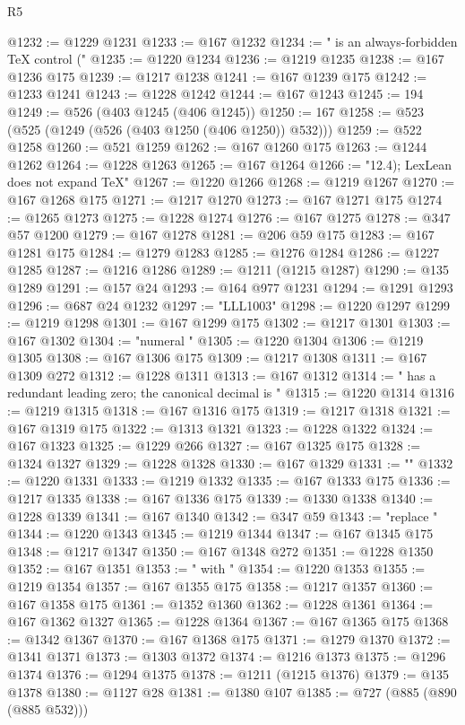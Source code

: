 \begin{lexlean}{R5}
\begin{coremodule}
{{{{{{{{{{{{{{{{{{{{{{{{{{{{{{{{{{{{{{{{{{{{{{{{{{{{{{{{{{{{{{@1232 := @1229 @1231
@1233 := @167 @1232
@1234 := " is an always-forbidden TeX control ("
@1235 := @1220 @1234
@1236 := @1219 @1235
@1238 := @167 @1236 @175
@1239 := @1217 @1238
@1241 := @167 @1239 @175
@1242 := @1233 @1241
@1243 := @1228 @1242
@1244 := @167 @1243
@1245 := 194
@1249 := @526 (@403 @1245 (@406 @1245))
@1250 := 167
@1258 := @523 (@525 (@1249 (@526 (@403 @1250 (@406 @1250)) @532)))
@1259 := @522 @1258
@1260 := @521 @1259
@1262 := @167 @1260 @175
@1263 := @1244 @1262
@1264 := @1228 @1263
@1265 := @167 @1264
@1266 := "12.4); LexLean does not expand TeX"
@1267 := @1220 @1266
@1268 := @1219 @1267
@1270 := @167 @1268 @175
@1271 := @1217 @1270
@1273 := @167 @1271 @175
@1274 := @1265 @1273
@1275 := @1228 @1274
@1276 := @167 @1275
@1278 := @347 @57 @1200
@1279 := @167 @1278
@1281 := @206 @59 @175
@1283 := @167 @1281 @175
@1284 := @1279 @1283
@1285 := @1276 @1284
@1286 := @1227 @1285
@1287 := @1216 @1286
@1289 := @1211 (@1215 @1287)
@1290 := @135 @1289
@1291 := @157 @24
@1293 := @164 @977 @1231
@1294 := @1291 @1293
@1296 := @687 @24 @1232
@1297 := "LLL1003"
@1298 := @1220 @1297
@1299 := @1219 @1298
@1301 := @167 @1299 @175
@1302 := @1217 @1301
@1303 := @167 @1302
@1304 := "numeral "
@1305 := @1220 @1304
@1306 := @1219 @1305
@1308 := @167 @1306 @175
@1309 := @1217 @1308
@1311 := @167 @1309 @272
@1312 := @1228 @1311
@1313 := @167 @1312
@1314 := " has a redundant leading zero; the canonical decimal is "
@1315 := @1220 @1314
@1316 := @1219 @1315
@1318 := @167 @1316 @175
@1319 := @1217 @1318
@1321 := @167 @1319 @175
@1322 := @1313 @1321
@1323 := @1228 @1322
@1324 := @167 @1323
@1325 := @1229 @266
@1327 := @167 @1325 @175
@1328 := @1324 @1327
@1329 := @1228 @1328
@1330 := @167 @1329
@1331 := ""
@1332 := @1220 @1331
@1333 := @1219 @1332
@1335 := @167 @1333 @175
@1336 := @1217 @1335
@1338 := @167 @1336 @175
@1339 := @1330 @1338
@1340 := @1228 @1339
@1341 := @167 @1340
@1342 := @347 @59
@1343 := "replace "
@1344 := @1220 @1343
@1345 := @1219 @1344
@1347 := @167 @1345 @175
@1348 := @1217 @1347
@1350 := @167 @1348 @272
@1351 := @1228 @1350
@1352 := @167 @1351
@1353 := " with "
@1354 := @1220 @1353
@1355 := @1219 @1354
@1357 := @167 @1355 @175
@1358 := @1217 @1357
@1360 := @167 @1358 @175
@1361 := @1352 @1360
@1362 := @1228 @1361
@1364 := @167 @1362 @1327
@1365 := @1228 @1364
@1367 := @167 @1365 @175
@1368 := @1342 @1367
@1370 := @167 @1368 @175
@1371 := @1279 @1370
@1372 := @1341 @1371
@1373 := @1303 @1372
@1374 := @1216 @1373
@1375 := @1296 @1374
@1376 := @1294 @1375
@1378 := @1211 (@1215 @1376)
@1379 := @135 @1378
@1380 := @1127 @28
@1381 := @1380 @107
@1385 := @727 (@885 (@890 (@885 @532)))
}}}}}}}}}}}}}}}}}}}}}}}}}}}}}}}}}}}}}}}}}}}}}}}}}}}}}}}}}}}}}}
\end{coremodule}
\end{lexlean}
